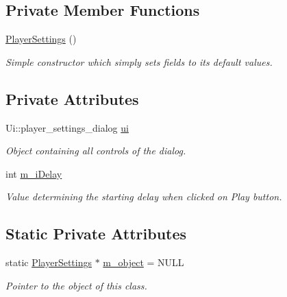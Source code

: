 \subsection*{Private Member Functions}
\begin{DoxyCompactItemize}
\item 
\hyperlink{class_player_settings_a0e73d43f99035a73efd94d51fd79e857}{Player\-Settings} ()
\begin{DoxyCompactList}\small\item\em Simple constructor which simply sets fields to its default values. \end{DoxyCompactList}\end{DoxyCompactItemize}
\subsection*{Private Attributes}
\begin{DoxyCompactItemize}
\item 
Ui\-::player\-\_\-settings\-\_\-dialog \hyperlink{class_player_settings_a165ee7d40a5e19f9930ad852efaecf09}{ui}
\begin{DoxyCompactList}\small\item\em Object containing all controls of the dialog. \end{DoxyCompactList}\item 
int \hyperlink{class_player_settings_a3741ec83814a0c32526c79b1d9febe8a}{m\-\_\-i\-Delay}
\begin{DoxyCompactList}\small\item\em Value determining the starting delay when clicked on Play button. \end{DoxyCompactList}\end{DoxyCompactItemize}
\subsection*{Static Private Attributes}
\begin{DoxyCompactItemize}
\item 
static \hyperlink{class_player_settings}{Player\-Settings} $\ast$ \hyperlink{class_player_settings_ab5a1cadfa2102bf207c5c8f89aba8a9b}{m\-\_\-object} = N\-U\-L\-L
\begin{DoxyCompactList}\small\item\em Pointer to the object of this class. \end{DoxyCompactList}\end{DoxyCompactItemize}


